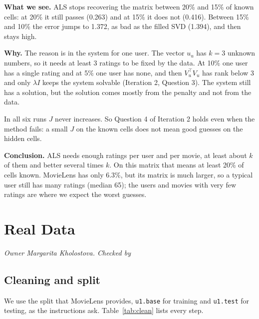 \textbf{What we see.} ALS stops recovering the matrix between 20\% and 15\% of known cells: at 20\% it still passes (0.263) and at 15\% it does not (0.416). Between 15\% and 10\% the error jumps to 1.372, as bad as the filled SVD (1.394), and then stays high.

\textbf{Why.} The reason is in the system for one user. The vector $u_u$ has $k = 3$ unknown numbers, so it needs at least 3 ratings to be fixed by the data. At 10\% one user has a single rating and at 5\% one user has none, and then $V_u^\top V_u$ has rank below 3 and only $\lambda I$ keeps the system solvable (Iteration 2, Question 3). The system still has a solution, but the solution comes mostly from the penalty and not from the data.

In all six runs $J$ never increases. So Question 4 of Iteration 2 holds even when the method fails: a small $J$ on the known cells does not mean good guesses on the hidden cells.

\textbf{Conclusion.} ALS needs enough ratings per user and per movie, at least about $k$ of them and better several times $k$. On this matrix that means at least 20\% of cells known. MovieLens has only 6.3\%, but its matrix is much larger, so a typical user still has many ratings (median 65); the users and movies with very few ratings are where we expect the worst guesses.

\section{Real Data}
\textit{Owner Margarita Kholostova. Checked by \underline{\hspace{4cm}}}


\subsection{Cleaning and split}

We use the split that MovieLens provides, \texttt{u1.base} for training and \texttt{u1.test} for testing, as the instructions ask. Table~\ref{tab:clean} lists every step.


